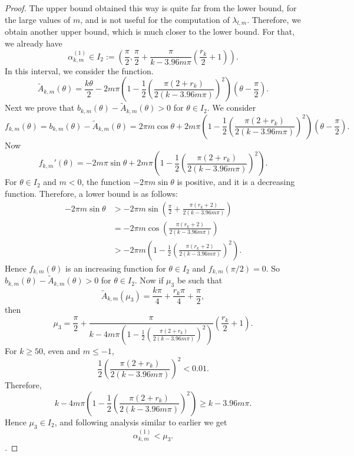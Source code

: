 \documentclass[12pt,reqno]{amsart}
\begin{document}
\begin{proof}
The upper bound obtained this way is quite far from the lower bound, for the large values of $m$, and is not 
useful for the computation of $\lambda_{l,m}$. Therefore, we obtain another upper bound, which is much closer to the lower bound. 
For that, we already have
$$
{\alpha}_{k,m}^{(1)}\in I_2:=\left(\frac{\pi}{2},\frac{\pi}{2}+\frac{\pi}{k-3.96m\pi}\left(\frac{r_k}{2}+1\right)\right).
$$
In this interval, we consider the function. 
$$
\tilde A_{k,m}(\theta)=\frac{k\theta}{2}-2m\pi\left(1-\frac{1}{2}\left(\frac{\pi(2+r_k)}{2(k-3.96m\pi)}\right)^2\right)\left(\theta-\frac{\pi}{2}\right).
$$
Next we prove that $b_{k,m}(\theta)-\tilde A_{k,m}(\theta)>0$ for $\theta\in I_2$. We consider
$$
f_{k,m}(\theta)=b_{k,m}(\theta)-\tilde A_{k,m}(\theta)=2\pi m\cos\theta+2m\pi\left(1-\frac{1}{2}\left(\frac{\pi(2+r_k)}{2(k-3.96m\pi)}\right)^2\right)\left(\theta-\frac{\pi}{2}\right).
$$
Now
$$
f_{k,m}'(\theta)=-2m\pi \sin\theta+2m\pi\left(1-\frac{1}{2}\left(\frac{\pi(2+r_k)}{2(k-3.96m\pi)}\right)^2\right).
$$
For $\theta\in I_2$ and $m<0$, the function $-2\pi m\sin\theta$ is positive, and it is a decreasing function. Therefore, a lower bound is as follows:
\begin{align*}
-2\pi m\sin\theta&>-2\pi m\sin\left(\frac{\pi}{2}+\frac{\pi(r_k+2)}{2(k-3.96m\pi)}\right)\\
&=-2\pi m\cos \left(\frac{\pi(r_k+2)}{2(k-3.96m\pi)}\right)\\
&>-2\pi m \left(1-\frac{1}{2}\left(\frac{\pi(r_k+2)}{2(k-3.96m\pi)}\right)^2\right).
\end{align*}
Hence $f_{k,m}(\theta)$ is an increasing function for $\theta\in I_2$ and $f_{k,m}(\pi/2)=0$. So $b_{k,m}(\theta)-
\tilde A_{k,m}(\theta)>0$ for $\theta\in I_2$. Now if $\mu_3$ be such that 
$$
\tilde A_{k,m}(\mu_3)=\frac{k\pi}{4}+\frac{r_k\pi}{4}+\frac{\pi}{2},
$$
then 
$$
\mu_3=\frac{\pi}{2}+\frac{\pi}{k-4m\pi\left(1-\frac{1}{2}\left(\frac{\pi(2+r_k)}{2(k-3.96m\pi)}\right)^2\right)}\left(\frac{r_k}{2}+1\right).
$$
For $k\ge 50$, even and $m\le-1$, 
$$
\frac{1}{2}\left(\frac{\pi(2+r_k)}{2(k-3.96m\pi)}\right)^2<0.01.
$$
Therefore, 
$$
k-4m\pi\left(1-\frac{1}{2}\left(\frac{\pi(2+r_k)}{2(k-3.96m\pi)}\right)^2\right)\ge k-3.96m\pi.
$$
Hence $\mu_3\in I_2$, and following analysis similar to earlier we get
$$
{\alpha}_{k,m}^{(1)}<\mu_3.
$$.
\end{proof}
\end{document}
